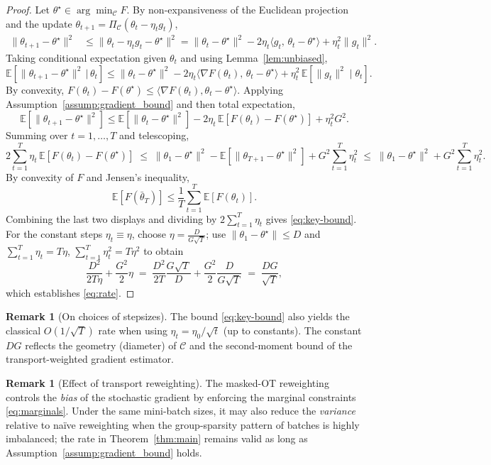 \documentclass[9pt]{extarticle}
\theoremstyle{definition}
\newtheorem{remark}[theorem]{Remark}
\begin{document}
\begin{proof}
Let $\theta^\star\in\arg\min_{\mathcal{C}} F$. By non-expansiveness of the Euclidean projection and the update $\theta_{t+1}=\Pi_{\mathcal{C}}(\theta_t-\eta_t g_t)$,
\begin{align*}
\|\theta_{t+1}-\theta^\star\|^2
&\le \|\theta_t-\eta_t g_t - \theta^\star\|^2
= \|\theta_t-\theta^\star\|^2 - 2\eta_t \langle g_t,\, \theta_t-\theta^\star\rangle + \eta_t^2 \|g_t\|^2.
\end{align*}
Taking conditional expectation given $\theta_t$ and using Lemma~\ref{lem:unbiased},
\[
\mathbb{E}\!\left[\|\theta_{t+1}-\theta^\star\|^2 \,\big|\, \theta_t\right]
\le
\|\theta_t-\theta^\star\|^2 - 2\eta_t \langle \nabla F(\theta_t),\, \theta_t-\theta^\star\rangle + \eta_t^2\,\mathbb{E}\!\left[\|g_t\|^2 \mid \theta_t\right].
\]
By convexity, $F(\theta_t)-F(\theta^\star)\le \langle \nabla F(\theta_t), \theta_t-\theta^\star\rangle$. Applying Assumption~\ref{assump:gradient_bound} and then total expectation,
\[
\mathbb{E}\!\left[\|\theta_{t+1}-\theta^\star\|^2\right]
\le
\mathbb{E}\!\left[\|\theta_t-\theta^\star\|^2\right]
- 2\eta_t\, \mathbb{E}\!\left[F(\theta_t)-F(\theta^\star)\right]
+ \eta_t^2 G^2.
\]
Summing over $t=1,\dots,T$ and telescoping,
\[
2\sum_{t=1}^T \eta_t \,\mathbb{E}\!\left[F(\theta_t)-F(\theta^\star)\right]
\;\le\;
\|\theta_1-\theta^\star\|^2 - \mathbb{E}\!\left[\|\theta_{T+1}-\theta^\star\|^2\right] + G^2 \sum_{t=1}^T \eta_t^2
\;\le\;
\|\theta_1-\theta^\star\|^2 + G^2 \sum_{t=1}^T \eta_t^2.
\]
By convexity of $F$ and Jensen’s inequality,
\[
\mathbb{E}\!\left[F(\bar{\theta}_T)\right]
\le \frac{1}{T}\sum_{t=1}^T \mathbb{E}\!\left[F(\theta_t)\right].
\]
Combining the last two displays and dividing by $2\sum_{t=1}^T\eta_t$ gives \eqref{eq:key-bound}. For the constant steps $\eta_t\equiv\eta$, choose $\eta=\frac{D}{G\sqrt{T}}$; use $\|\theta_1-\theta^\star\|\le D$ and $\sum_{t=1}^T \eta_t = T\eta$, $\sum_{t=1}^T \eta_t^2=T\eta^2$ to obtain
\[
\frac{D^2}{2T\eta}+\frac{G^2}{2}\eta \;=\; \frac{D^2}{2T}\frac{G\sqrt{T}}{D} + \frac{G^2}{2}\frac{D}{G\sqrt{T}} \;=\; \frac{DG}{\sqrt{T}},
\]
which establishes \eqref{eq:rate}.
\end{proof}
\begin{remark}[On choices of stepsizes]
The bound \eqref{eq:key-bound} also yields the classical $O(1/\sqrt{T})$ rate when using $\eta_t = \eta_0/\sqrt{t}$ (up to constants). The constant $DG$ reflects the geometry (diameter) of $\mathcal{C}$ and the second-moment bound of the transport-weighted gradient estimator.
\end{remark}
\begin{remark}[Effect of transport reweighting]
The masked-OT reweighting controls the \emph{bias} of the stochastic gradient by enforcing the marginal constraints \eqref{eq:marginals}. Under the same mini-batch sizes, it may also reduce the \emph{variance} relative to naïve reweighting when the group-sparsity pattern of batches is highly imbalanced; the rate in Theorem~\ref{thm:main} remains valid as long as Assumption~\ref{assump:gradient_bound} holds.
\end{remark}
\end{document}
